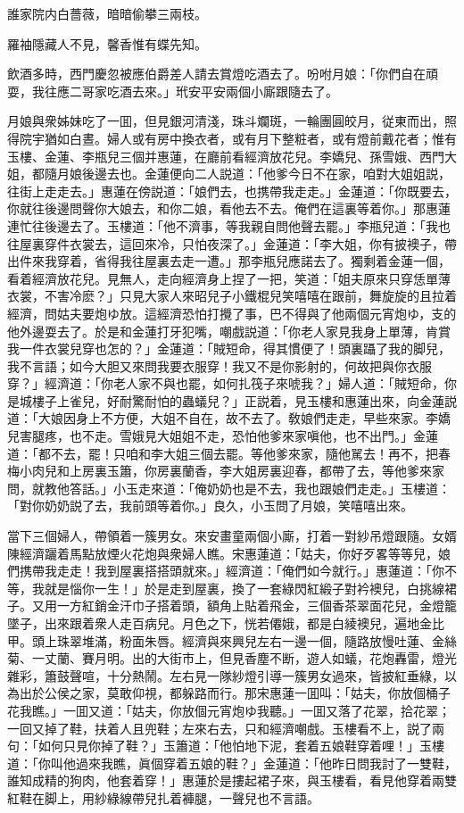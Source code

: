 \begin{myquote}
誰家院内白薔薇，暗暗偷攀三兩枝。

羅袖隱藏人不見，馨香惟有蝶先知。
\end{myquote}

飲酒多時，西門慶忽被應伯爵差人請去賞燈吃酒去了。吩咐月娘：「你們自在頑耍，我往應二哥家吃酒去來。」玳安平安兩個小廝跟隨去了。

月娘與衆姊妹吃了一囬，但見銀河清淺，珠斗斕斑，一輪團圓皎月，従東而出，照得院宇猶如白晝。婦人或有房中換衣者，或有月下整粧者，或有燈前戴花者；惟有玉樓、金蓮、李瓶兒三個并惠蓮，在廳前看經濟放花兒。李嬌兒、孫雪娥、西門大姐，都隨月娘後邊去也。金蓮便向二人説道：「他爹今日不在家，咱對大姐姐説，往街上走走去。」惠蓮在傍説道：「娘們去，也携帶我走走。」金蓮道：「你既要去，你就往後邊問聲你大娘去，和你二娘，看他去不去。俺們在這裏等着你。」那惠蓮連忙往後邊去了。玉樓道：「他不濟事，等我親自問他聲去罷。」李瓶兒道：「我也往屋裏穿件衣裳去，這回來冷，只怕夜深了。」金蓮道：「李大姐，你有披襖子，帶出件來我穿着，省得我往屋裏去走一遭。」那李瓶兒應諾去了。獨剩着金蓮一個，看着經濟放花兒。見無人，走向經濟身上捏了一把，笑道：「姐夫原來只穿恁單薄衣裳，不害冷麽？」只見大家人來昭兒子小鐵棍兒笑嘻嘻在跟前，舞旋旋的且拉着經濟，問姑夫要炮ゆ放。這經濟恐怕打攪了事，巴不得與了他兩個元宵炮ゆ，支的他外邊耍去了。於是和金蓮打牙犯嘴，嘲戲説道：「你老人家見我身上單薄，肯賞我一件衣裳兒穿也怎的？」金蓮道：「賊短命，得其慣便了！頭裏躡了我的脚兒，我不言語；如今大胆又來問我要衣服穿！我又不是你影射的，何故把與你衣服穿？」經濟道：「你老人家不與也罷，如何扎筏子來唬我？」婦人道：「賊短命，你是城樓子上雀兒，好耐驚耐怕的蟲蟻兒？」正説着，見玉樓和惠蓮出來，向金蓮説道：「大娘因身上不方便，大姐不自在，故不去了。敎娘們走走，早些來家。李嬌兒害腿疼，也不走。雪娥見大姐姐不走，恐怕他爹來家嗔他，也不出門。」金蓮道：「都不去，罷！只咱和李大姐三個去罷。等他爹來家，隨他駡去！再不，把春梅小肉兒和上房裏玉簫，你房裏蘭香，李大姐房裏迎春，都帶了去，等他爹來家問，就教他答話。」小玉走來道：「俺奶奶也是不去，我也跟娘們走走。」玉樓道：「對你奶奶説了去，我前頭等着你。」良久，小玉問了月娘，笑嘻嘻出來。

當下三個婦人，帶領着一簇男女。來安畫童兩個小廝，打着一對紗吊燈跟隨。女婿陳經濟躧着馬點放煙火花炮與衆婦人瞧。宋惠蓮道：「姑夫，你好歹畧等等兒，娘們携帶我走走！我到屋裏搭搭頭就來。」經濟道：「俺們如今就行。」惠蓮道：「你不等，我就是惱你一生！」於是走到屋裏，換了一套綠閃紅緞子對衿襖兒，白挑線裙子。又用一方紅銷金汗巾子搭着頭，額角上貼着飛金，三個香茶翠面花兒，金燈籠墜子，出來跟着衆人走百病兒。月色之下，恍若僊娥，都是白綾襖兒，遍地金比甲。頭上珠翠堆滿，粉面朱唇。經濟與來興兒左右一邊一個，隨路放慢吐蓮、金絲菊、一丈蘭、賽月明。出的大街市上，但見香塵不断，遊人如蟻，花炮轟雷，燈光雜彩，簫鼓聲喧，十分熱鬧。左右見一隊紗燈引導一簇男女過來，皆披紅垂綠，以為出於公侯之家，莫敢仰視，都躲路而行。那宋惠蓮一囬叫：「姑夫，你放個桶子花我瞧。」一囬又道：「姑夫，你放個元宵炮ゆ我聽。」一囬又落了花翠，拾花翠；一回又掉了鞋，扶着人且兜鞋；左來右去，只和經濟嘲戲。玉樓看不上，説了兩句：「如何只見你掉了鞋？」玉簫道：「他怕地下泥，套着五娘鞋穿着哩！」玉樓道：「你叫他過來我瞧，眞個穿着五娘的鞋？」金蓮道：「他昨日問我討了一雙鞋，誰知成精的狗肉，他套着穿！」惠蓮於是摟起裙子來，與玉樓看，看見他穿着兩雙紅鞋在脚上，用紗綠線帶兒扎着褲腿，一聲兒也不言語。


